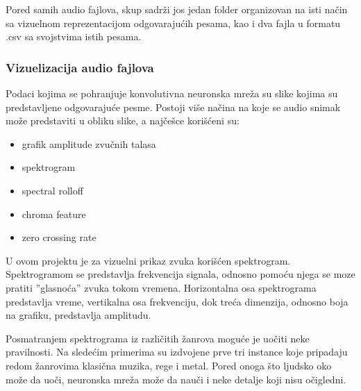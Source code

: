 \documentclass{article}
\begin{document}
Pored samih audio fajlova, skup sadrži jos jedan folder organizovan na isti način sa vizuelnom reprezentacijom odgovarajućih pesama, kao i dva fajla u formatu .csv sa svojstvima istih pesama.

\subsubsection{Vizuelizacija audio fajlova}
Podaci kojima se pohranjuje konvolutivna neuronska mreža su slike kojima su predstavljene odgovarajuće pesme. Postoji više načina na koje se audio snimak može predstaviti u obliku slike, a najčešce korišćeni su:
\begin{itemize}
    \item grafik amplitude zvučnih talasa
    \item spektrogram
    \item spectral rolloff
    \item chroma feature
    \item zero crossing rate
\end{itemize}

U ovom projektu je za vizuelni prikaz zvuka korišćen spektrogram. Spektrogramom se predstavlja frekvencija signala, odnosno pomoću njega se moze pratiti ''glasnoća'' zvuka tokom vremena. Horizontalna osa spektrograma predstavlja vreme, vertikalna osa frekvenciju, dok treća dimenzija, odnosno boja na grafiku, predstavlja amplitudu.


Posmatranjem spektrograma iz različitih žanrova moguće je uočiti neke pravilnosti. Na sledećim primerima su izdvojene prve tri instance koje pripadaju redom žanrovima klasična muzika, rege i metal. Pored onoga što ljudsko oko može da uoči, neuronska mreža može da nauči i neke detalje koji nisu očigledni.

\newpage
\end{document}
